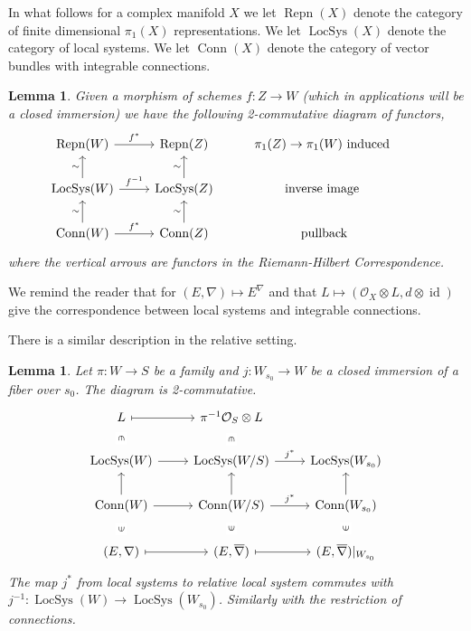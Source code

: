 \documentclass[12pt]{book}
\numberwithin{equation}{section}
\newtheorem{lemma}[theorem]{Lemma}
\theoremstyle{definition}
\theoremstyle{remark}
\newcommand{\Ocal}{\mathcal{O}}
\newcommand{\LocSys}{\operatorname{LocSys}}
\newcommand{\Conn}{\operatorname{Conn}}
\newcommand{\Repn}{\operatorname{Repn}}
\newcommand{\id}{\operatorname{id}}
\begin{document}
In what follows for a complex manifold $X$ we let $\Repn(X)$ denote the category of finite dimensional $\pi_1(X)$ representations. 
We let $\LocSys(X)$ denote the category of local systems.
We let $\Conn(X)$ denote the category of vector bundles with integrable connections. 
\begin{lemma}
	Given a morphism of schemes $f: Z \to W$ (which in applications will be a closed immersion) we have the following 2-commutative diagram of functors,
	$$\begin{tikzcd}
	\Repn(W) \ar[r, "f^*"] & \Repn(Z)  & \pi_1(Z)\to \pi_1(W) \mbox{ induced}\\
	\LocSys(W) \ar[r,"f^{-1}"] \ar[u,"\sim"]& \LocSys(Z) \ar[u,"\sim"] & \mbox{inverse image} &\\
	\Conn(W) \ar[r, "f^*"] \ar[u, "\sim"]& \Conn(Z) \ar[u,"\sim"] & \mbox{ pullback}
	\end{tikzcd}
	$$
	where the vertical arrows are functors in the Riemann-Hilbert Correspondence. 
\end{lemma}
We remind the reader that for $(E,\nabla) \mapsto E^{\nabla}$ and that $L\mapsto (\Ocal_X \otimes L, d\otimes \id)$ give the correspondence between local systems and integrable connections. 

There is a similar description in the relative setting.
\begin{lemma}\label{L:relative-functorality}
	Let $\pi: W\to S$ be a family and $j: W_{s_0} \to W$ be a closed immersion of a fiber over $s_0$. 
	The diagram is 2-commutative.
	$$\begin{tikzcd}[contains/.style = {draw=none,"\in" description,sloped}]
	L \ar[d,contains]  \ar[r,mapsto] & \pi^{-1} \Ocal_S \otimes L \ar[d, contains]& \\
	\LocSys(W) \ar[r] & \LocSys(W/S) \ar[r,"j^*"] & \LocSys(W_{s_0}) \\
	\Conn(W) \ar[r] \ar[u] & \Conn(W/S) \ar[u] \ar[r, "j^*"]& \Conn(W_{s_0}) \ar[u] \\
	(E,\nabla) \ar[u,contains] \ar[r,mapsto] & (E,\overline{\nabla}) \ar[r,mapsto] \ar[u,contains] & (E,\overline{\nabla})\vert_{W_{s_0}} \ar[u,contains]
	\end{tikzcd}
	$$
	The map $j^*$ from local systems to relative local system commutes with $j^{-1}: \LocSys(W) \to \LocSys(W_{s_0})$. 
	Similarly with the restriction of connections.
\end{lemma}
\end{document}
